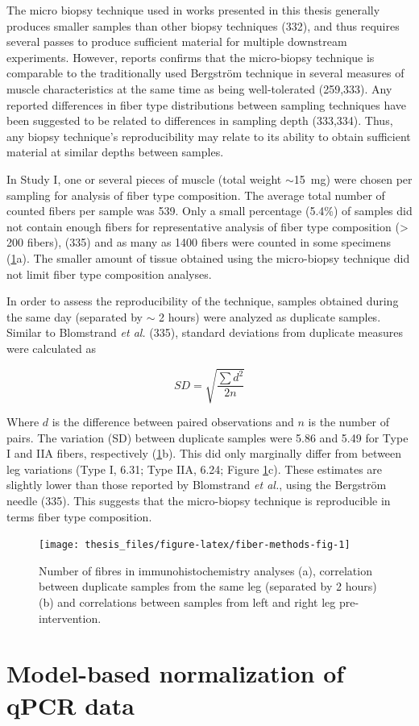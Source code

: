 \documentclass[twoside,10pt]{gihclass} %
\begin{document}
The micro biopsy technique used in works presented in this thesis generally produces smaller samples than other biopsy techniques (332), and thus
requires several passes to produce sufficient material for multiple
downstream experiments. However, reports confirms that the micro-biopsy
technique is comparable to the traditionally used Bergström technique in
several measures of muscle characteristics at the same time as being
well-tolerated (259,333).
Any reported differences in fiber type distributions between sampling techniques have been suggested to be related to differences in sampling depth (333,334).
Thus, any biopsy technique's reproducibility may relate to its ability to obtain sufficient material at similar depths between samples.

In Study I, one or several pieces of muscle (total weight
\(\sim\)\SI{15}{mg}) were chosen per sampling for analysis of fiber type
composition. The average total number of counted fibers per sample was 539.
Only a small percentage (5.4\%) of samples did not contain enough fibers for representative analysis of fiber type composition (\textgreater{} 200 fibers),
(335)
and as many as 1400 fibers were counted in some specimens (\ref{fig:fiber-methods-fig}a).
The smaller amount of tissue obtained using the micro-biopsy technique did not limit fiber type composition analyses.

In order to assess the reproducibility of the technique, samples obtained during the same day (separated by \(\sim\) 2 hours) were analyzed as duplicate samples.
Similar to Blomstrand \emph{et al.} (335), standard deviations from duplicate measures were calculated as

\[SD = \sqrt{\frac{\sum{d^2}}{2n}}\]

Where \(d\) is the difference between paired observations and \(n\) is the number of pairs.
The variation (SD) between duplicate samples were 5.86 and 5.49 for Type I and IIA fibers, respectively (\ref{fig:fiber-methods-fig}b).
This did only marginally differ from between leg variations (Type I, 6.31; Type IIA, 6.24; Figure \ref{fig:fiber-methods-fig}c).
These estimates are slightly lower than those reported by Blomstrand \emph{et al.}, using the Bergström needle
(335). This suggests that the micro-biopsy technique is reproducible in terms fiber type composition.
\begin{figure}

{\centering \texttt{[image: thesis\_files/figure-latex/fiber-methods-fig-1]} 

}

\caption[Characteristics of biopsy samples used in immunohistochemistry analyses.]{Number of fibres in immunohistochemistry analyses (a), correlation between duplicate samples from the same leg (separated by 2 hours) (b) and correlations between samples from left and right leg pre-intervention.}\label{fig:fiber-methods-fig}
\end{figure}
\hypertarget{model-based-normalization-of-qpcr-data}{%
\section{Model-based normalization of qPCR data}\label{model-based-normalization-of-qpcr-data}}
\end{document}
